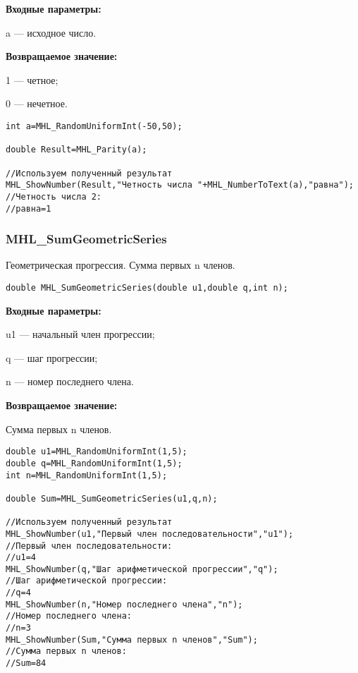 \documentclass[a4paper,12pt]{article}
\begin{document}
\textbf{Входные параметры:}  
 
a --- исходное число.

\textbf{Возвращаемое значение:}

 1 --- четное;
 
 0 --- нечетное.


\begin{lstlisting}[label=code_use_MHL_Parity,caption=Пример использования]
int a=MHL_RandomUniformInt(-50,50);

double Result=MHL_Parity(a);

//Используем полученный результат
MHL_ShowNumber(Result,"Четность числа "+MHL_NumberToText(a),"равна");
//Четность числа 2:
//равна=1
\end{lstlisting}

\subsubsection{MHL\_SumGeometricSeries}\label{MHL_SumGeometricSeries}

Геометрическая прогрессия. Сумма первых n членов.


\begin{lstlisting}[label=code_syntax_MHL_SumGeometricSeries,caption=Синтаксис]
double MHL_SumGeometricSeries(double u1,double q,int n);
\end{lstlisting}

\textbf{Входные параметры:}  
 
u1 --- начальный член прогрессии;
 
q --- шаг  прогрессии;
 
n --- номер последнего члена.

\textbf{Возвращаемое значение:}
 
Сумма первых n членов.


\begin{lstlisting}[label=code_use_MHL_SumGeometricSeries,caption=Пример использования]
double u1=MHL_RandomUniformInt(1,5);
double q=MHL_RandomUniformInt(1,5);
int n=MHL_RandomUniformInt(1,5);

double Sum=MHL_SumGeometricSeries(u1,q,n);

//Используем полученный результат
MHL_ShowNumber(u1,"Первый член последовательности","u1");
//Первый член последовательности:
//u1=4
MHL_ShowNumber(q,"Шаг арифметической прогрессии","q");
//Шаг арифметической прогрессии:
//q=4
MHL_ShowNumber(n,"Номер последнего члена","n");
//Номер последнего члена:
//n=3
MHL_ShowNumber(Sum,"Сумма первых n членов","Sum");
//Сумма первых n членов:
//Sum=84
\end{lstlisting}
\end{document}
